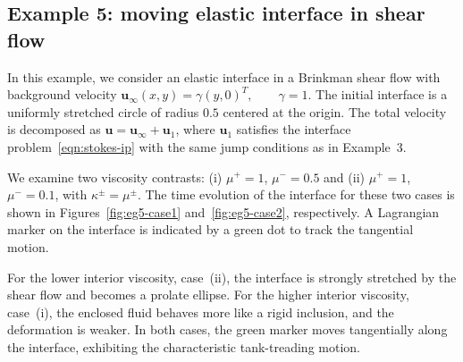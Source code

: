\documentclass[preprint,11pt]{elsarticle}
\theoremstyle{remark}
\newcommand{\bm}[1]{\boldsymbol{#1}}
\begin{document}
\subsection{Example 5: moving elastic interface in shear flow}
In this example, we consider an elastic interface in a Brinkman shear flow with background velocity $\bm u_{\infty}(x,y) = \gamma (y, 0)^T, \qquad \gamma = 1$. The initial interface is a uniformly stretched circle of radius $0.5$ centered at the origin.
The total velocity is decomposed as $\bm u = \bm u_\infty + \bm u_1$, where $\bm u_1$ satisfies the interface problem~\eqref{eqn:stokes-ip} with the same jump conditions as in Example~3.

We examine two viscosity contrasts:
(i) $\mu^+ = 1$, $\mu^- = 0.5$ and
(ii) $\mu^+ = 1$, $\mu^- = 0.1$, with $\kappa^\pm = \mu^\pm$.
The time evolution of the interface for these two cases is shown in Figures~\ref{fig:eg5-case1} and~\ref{fig:eg5-case2}, respectively.
A Lagrangian marker on the interface is indicated by a green dot to track the tangential motion.

For the lower interior viscosity, case~(ii), the interface is strongly stretched by the shear flow and becomes a prolate ellipse.
For the higher interior viscosity, case~(i), the enclosed fluid behaves more like a rigid inclusion, and the deformation is weaker.
In both cases, the green marker moves tangentially along the interface, exhibiting the characteristic tank-treading motion.
\end{document}
